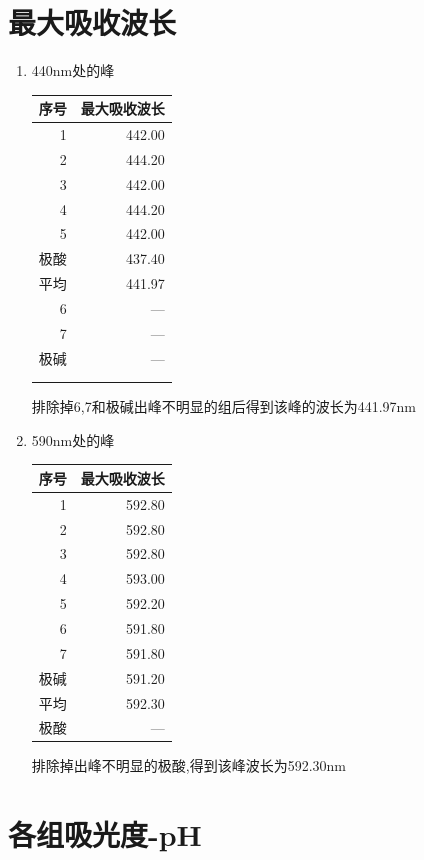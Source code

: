 \documentclass[11pt]{report}
\begin{document}
\section{最大吸收波长}
\label{sec:org7ca3d81}
\begin{enumerate}
\item 440nm处的峰
\label{sec:org76ad615}
\begin{center}
\begin{tabular}{rr}
序号 & 最大吸收波长\\
\hline
1 & 442.00\\
2 & 444.20\\
3 & 442.00\\
4 & 444.20\\
5 & 442.00\\
极酸 & 437.40\\
平均 & 441.97\\
6 & ---\\
7 & ---\\
极碱 & ---\\
 & \\
 & \\
\end{tabular}
\end{center}
排除掉6,7和极碱出峰不明显的组后得到该峰的波长为441.97nm

\item 590nm处的峰
\label{sec:org5579f9e}
\begin{center}
\begin{tabular}{rr}
序号 & 最大吸收波长\\
\hline
1 & 592.80\\
2 & 592.80\\
3 & 592.80\\
4 & 593.00\\
5 & 592.20\\
6 & 591.80\\
7 & 591.80\\
极碱 & 591.20\\
平均 & 592.30\\
极酸 & ---\\
\end{tabular}
\end{center}
排除掉出峰不明显的极酸,得到该峰波长为592.30nm
\end{enumerate}

\section{各组吸光度-pH}
\label{sec:org7be39ef}
\end{document}
